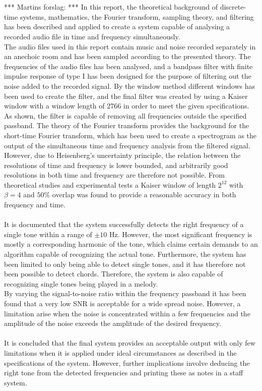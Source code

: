 \\ \\
*** Martins forslag: ***
In this report, the theoretical background of discrete-time systems, mathematics, the Fourier transform, sampling theory, and filtering has been described and applied to create a system capable of analysing a recorded audio file in time and frequency simultaneously.
\\
The audio files used in this report contain music and noise recorded separately in an anechoic room and has been sampled according to the presented theory. The frequencies of the audio files has been analysed, and a bandpass filter with finite impulse response of type I has been designed for the purpose of filtering out the noise added to the recorded signal. By the window method different windows has been used to create the filter, and the final filter was created by using a Kaiser window with a window length of 2766 in order to meet the given specifications. As shown, the filter is capable of removing all frequencies outside the specified passband. The theory of the Fourier transform provides the background for the short-time Fourier transform, which has been used to create a spectrogram as the output of the simultaneous time and frequency analysis from the filtered signal. However, due to Heisenberg's uncertainty principle, the relation between the resolutions of time and frequency is lower bounded, and arbitrarily good resolutions in both time and frequency are therefore not possible. From theoretical studies and experimental tests a Kaiser window of length $2^{12}$ with $\beta = 4$ and $50\%$ overlap was found to provide a reasonable accuracy in both frequency and time.
\\ \\
It is documented that the system successfully detects the right frequency of a single tone within a range of $\pm 10$ Hz. However, the most significant frequency is mostly a corresponding harmonic of the tone, which claims certain demands to an algorithm capable of recognizing the actual tone. Furthermore, the system has been limited to only being able to detect single tones, and it has therefore not been possible to detect chords. Therefore, the system is also capable of recognizing single tones being played in a melody.
\\
By varying the signal-to-noise ratio within the frequency  passband it has been found that a very low SNR is acceptable for a wide spread noise. However, a limitation arise when the noise is concentrated within a few frequencies and the amplitude of the noise exceeds the amplitude of the desired frequency.
\\ \\
It is concluded that the final system provides an acceptable output with only few limitations when it is applied under ideal circumstances as described in the specifications of the system. However, further implications involve deducing the right tone from the detected frequencies and printing these as notes in a staff system.

 